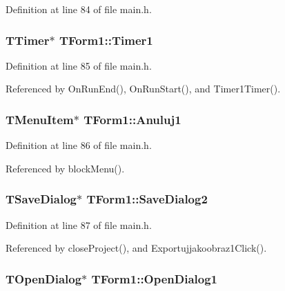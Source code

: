 Definition at line 84 of file main.h.\hypertarget{classTForm1_b485ef6199745c5c2982d8368ec9d1ff}{
\subsubsection[Timer1]{\setlength{\rightskip}{0pt plus 5cm}TTimer$\ast$ {\bf TForm1::Timer1}}}
\label{classTForm1_b485ef6199745c5c2982d8368ec9d1ff}




Definition at line 85 of file main.h.

Referenced by OnRunEnd(), OnRunStart(), and Timer1Timer().\hypertarget{classTForm1_70c2a2eb6c9f1bd59047ef27a073e515}{
\subsubsection[Anuluj1]{\setlength{\rightskip}{0pt plus 5cm}TMenuItem$\ast$ {\bf TForm1::Anuluj1}}}
\label{classTForm1_70c2a2eb6c9f1bd59047ef27a073e515}




Definition at line 86 of file main.h.

Referenced by blockMenu().\hypertarget{classTForm1_144e0a54931b8c3fdfcaa6ffbccd4bb8}{
\subsubsection[SaveDialog2]{\setlength{\rightskip}{0pt plus 5cm}TSaveDialog$\ast$ {\bf TForm1::SaveDialog2}}}
\label{classTForm1_144e0a54931b8c3fdfcaa6ffbccd4bb8}




Definition at line 87 of file main.h.

Referenced by closeProject(), and Exportujjakoobraz1Click().\hypertarget{classTForm1_355801e3a8dc885ec19da6b9a5c3aecf}{
\subsubsection[OpenDialog1]{\setlength{\rightskip}{0pt plus 5cm}TOpenDialog$\ast$ {\bf TForm1::OpenDialog1}}}
\label{classTForm1_355801e3a8dc885ec19da6b9a5c3aecf}




